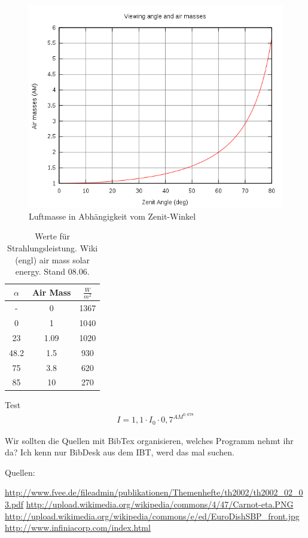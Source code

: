 \documentclass[fontsize=10pt,paper=a4,bibliography=totoc]{scrartcl}
\begin{document}
\begin{figure}[htb]
	\centering
	\includegraphics[width=\textwidth]{images/Airmass.png}
	\caption{Luftmasse in Abhängigkeit vom Zenit-Winkel}
	\label{pic:AirMass}
\end{figure}

\begin{table}
\centering
	\caption{Werte für Strahlungsleistung. Wiki (engl) air mass solar energy. Stand 08.06.}
	\label{tab:airmass}
\begin{tabular}{|c|c|c|}
	\hline
	$\alpha$ & Air Mass & $\frac{W}{m^2}$\\
	\hline
	- & 0 & 1367\\
	\hline
	0 & 1 & 1040\\
	\hline
	23 & 1.09 & 1020\\
	\hline
	48.2 & 1.5 & 930\\
	\hline
	75 & 3.8 & 620\\
	\hline
	85 & 10 & 270\\
	\hline
\end{tabular}
\end{table}
Test
\begin{align*}
	I=1,1\cdot I_0 \cdot 0,7^{AM^{0,678}}
	\label{eqn:Intensity}
\end{align*}

\newpage
Wir sollten die Quellen mit BibTex organisieren, welches Programm nehmt ihr da? Ich kenn nur BibDesk aus dem IBT, werd das mal suchen.

Quellen:

\url{http://www.fvee.de/fileadmin/publikationen/Themenhefte/th2002/th2002_02_03.pdf}
\url{http://upload.wikimedia.org/wikipedia/commons/4/47/Carnot-eta.PNG}
\url{http://upload.wikimedia.org/wikipedia/commons/e/ed/EuroDishSBP_front.jpg}
\url{http://www.infiniacorp.com/index.html}
\end{document}
